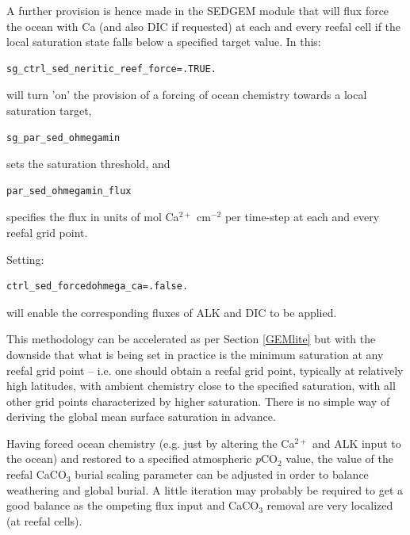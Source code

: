 \documentclass[11pt,fleqn]{book} %
\begin{document}
\begin{enumerate}
A further provision is hence made in the SEDGEM module that will flux force the ocean with Ca (and also DIC if requested) at each and every reefal cell if the local saturation state falls below a specified target value. In this:
\vspace{-1mm}\begin{verbatim}
sg_ctrl_sed_neritic_reef_force=.TRUE.
\end{verbatim}\vspace{-1mm}
will turn 'on' the provision of a forcing of ocean chemistry towards a local saturation target, 
\vspace{-1mm}\begin{verbatim}
sg_par_sed_ohmegamin
\end{verbatim}\vspace{-1mm}
sets the saturation threshold, and
\vspace{-1mm}\begin{verbatim}
par_sed_ohmegamin_flux
\end{verbatim}\vspace{-1mm}
specifies the flux in units of mol Ca\(^{2+}\) cm\(^{-2}\) per time-step at each and every reefal grid point.

Setting:
\vspace{-1mm}\begin{verbatim}
ctrl_sed_forcedohmega_ca=.false.
\end{verbatim}\vspace{-1mm}
will enable the corresponding fluxes of ALK and DIC to be applied.

This methodology can be accelerated as per Section \ref{GEMlite} but with the downside that what is being set in practice is the minimum saturation at any reefal grid point -- i.e. one should obtain a reefal grid point, typically at relatively high latitudes, with ambient chemistry close to the specified saturation, with all other grid points characterized by higher saturation. There is no simple way of deriving the global mean surface saturation in advance.

Having forced ocean chemistry (e.g. just by altering the Ca\(^{2+}\) and ALK input to the ocean) and restored to a specified atmospheric \textit{p}CO\(_{2}\) value, the value of the reefal CaCO$_{3}$ burial scaling parameter can be adjusted in order to balance weathering and global burial. A little iteration may probably be required to get a good balance as the ompeting flux input and CaCO$_{3}$ removal are very localized (at reefal cells). 


\end{enumerate}
\end{document}
